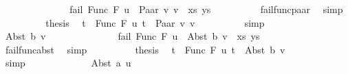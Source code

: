 \begin{isabellebody}
\ \ \ \ \ \ %
\isanewline
\ \ \ \ \ \ \isamarkupfalse%
\ {\isachardoublequoteopen}fail\ {\isacharparenleft}{\kern0pt}{\isacharparenleft}{\kern0pt}Func\ F\ u\ {\isasymapprox}{\isacharquery}{\kern0pt}\ Paar\ v{}\ v{}{\isacharparenright}{\kern0pt}\ {\isacharhash}{\kern0pt}\ xs{\isacharcomma}{\kern0pt}\ ys{\isacharparenright}{\kern0pt}{\isachardoublequoteclose}\isanewline
\ \ \ \ \ \ \ \ \isamarkupfalse%
\ fail{\isacharunderscore}{\kern0pt}func{\isacharunderscore}{\kern0pt}paar\ \isamarkupfalse%
\ simp\isanewline
\ \ \ \ \ \ \isamarkupfalse%
\ \isamarkupfalse%
\ {\isacharquery}{\kern0pt}thesis\ \isamarkupfalse%
\ {\isacartoucheopen}t{}\ {\isacharequal}{\kern0pt}\ Func\ F\ u{\isacartoucheclose}\ {\isacartoucheopen}t{}\ {\isacharequal}{\kern0pt}\ Paar\ v{}\ v{}{\isacartoucheclose}\isanewline
\ \ \ \ \ \ \ \ \isamarkupfalse%
\ simp\isanewline
\ \ \ \ \isamarkupfalse%
\isanewline
\ \ \ \ \ \ \isamarkupfalse%
\ {\isacharparenleft}{\kern0pt}Abst\ b\ v{\isacharparenright}{\kern0pt}\isanewline
\ \ \ \ \ \ %
\isanewline
\ \ \ \ \ \ \isamarkupfalse%
\ {\isachardoublequoteopen}fail\ {\isacharparenleft}{\kern0pt}{\isacharparenleft}{\kern0pt}Func\ F\ u\ {\isasymapprox}{\isacharquery}{\kern0pt}\ Abst\ b\ v{\isacharparenright}{\kern0pt}\ {\isacharhash}{\kern0pt}\ xs{\isacharcomma}{\kern0pt}\ ys{\isacharparenright}{\kern0pt}{\isachardoublequoteclose}\isanewline
\ \ \ \ \ \ \ \ \isamarkupfalse%
\ fail{\isacharunderscore}{\kern0pt}func{\isacharunderscore}{\kern0pt}abst\ \isamarkupfalse%
\ simp\isanewline
\ \ \ \ \ \ \isamarkupfalse%
\ \isamarkupfalse%
\ {\isacharquery}{\kern0pt}thesis\ \isamarkupfalse%
\ {\isacartoucheopen}t{}\ {\isacharequal}{\kern0pt}\ Func\ F\ u{\isacartoucheclose}\ {\isacartoucheopen}t{}\ {\isacharequal}{\kern0pt}\ Abst\ b\ v{\isacartoucheclose}\isanewline
\ \ \ \ \ \ \ \ \isamarkupfalse%
\ simp\isanewline
\ \ \ \ \isamarkupfalse%
\isanewline
\ \ \isamarkupfalse%
\isanewline
\ \ \ \ \isamarkupfalse%
\ {\isacharparenleft}{\kern0pt}Abst\ a\ u{\isacharparenright}{\kern0pt}\isanewline
\ \ \ \ \isamarkupfalse%

\end{isabellebody}
